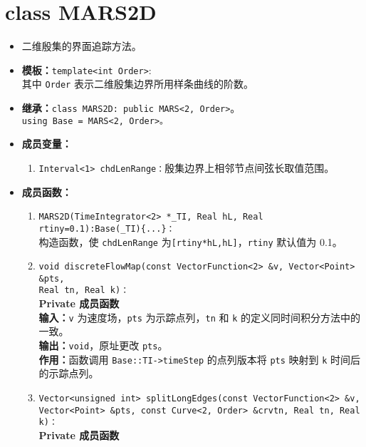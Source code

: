 \documentclass[a4paper,twoside]{ctexart}
\begin{document}
\section{class MARS2D}
\begin{itemize}
    \item 二维殷集的界面追踪方法。
    \item \textbf{模板：}\texttt{template<int Order>}:\\
    其中 \texttt{Order} 表示二维殷集边界所用样条曲线的阶数。
    \item \textbf{继承：}\texttt{class MARS2D: public MARS<2, Order>}。\\
    \texttt{using Base = MARS<2, Order>。}
    \item \textbf{成员变量：}
            \begin{enumerate}[(1)]
                \item \texttt{Interval<1> chdLenRange：}殷集边界上相邻节点间弦长取值范围。
            \end{enumerate}
    \item \textbf{成员函数：}
            \begin{enumerate}[(1)]
                \item \texttt{MARS2D(TimeIntegrator<2> *\_TI, Real hL, Real rtiny=0.1):Base(\_TI)\{...\}：}\\
                构造函数，使 \texttt{chdLenRange} 为\texttt{[rtiny*hL,hL]}，\texttt{rtiny} 默认值为 0.1。
                \item \texttt{void discreteFlowMap(const VectorFunction<2> \&v, Vector<Point> \&pts, \\Real tn, Real k)：}\\
                \textbf{Private 成员函数}\\
                \textbf{输入：}\texttt{v} 为速度场，\texttt{pts} 为示踪点列，\texttt{tn} 和 \texttt{k} 的定义同时间积分方法中的一致。\\
                \textbf{输出：}\texttt{void}，原址更改 \texttt{pts}。\\
                \textbf{作用：}函数调用 \texttt{Base::TI->timeStep} 的点列版本将 \texttt{pts} 映射到 \texttt{k} 时间后的示踪点列。
                \item \texttt{Vector<unsigned int> splitLongEdges(const VectorFunction<2> \&v, \\Vector<Point> \&pts, const Curve<2, Order> \&crvtn, Real tn, Real k)：}\\
                \textbf{Private 成员函数}\\

\end{enumerate}
\end{itemize}
\end{document}
